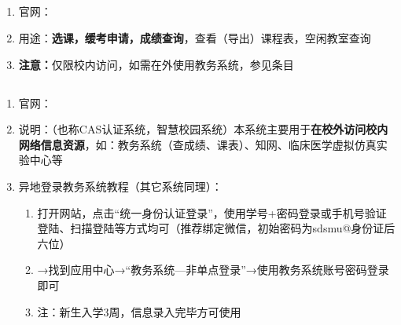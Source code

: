 \subsection[教务系统]{\textbf{}}
\label{academic_affairs_system}
\begin{enumerate}
    \item 官网：
    \item 用途：\textbf{选课，缓考申请，成绩查询}，查看（导出）课程表，空闲教室查询
    \item \textbf{注意：}仅限校内访问，如需在外使用教务系统，参见条目
\end{enumerate}

\subsection[CAS资源访问控制系统（校内VPN）]{\textbf{}\footnotemark}
\label{cas_system}
\begin{enumerate}
    \item 官网：
    \item 说明：（也称CAS认证系统，智慧校园系统）本系统主要用于\textbf{在校外访问校内网络信息资源}，如：教务系统（查成绩、课表）、知网、临床医学虚拟仿真实验中心\footnotemark 等
    \item 异地登录教务系统教程（其它系统同理）：
          \begin{enumerate}
              \item 打开网站，点击“统一身份认证登录”，使用学号+密码登录或手机号验证登陆、扫描登陆等方式均可（推荐绑定微信，初始密码为sdsmu@身份证后六位）
              \item →找到应用中心→“教务系统—非单点登录”\footnotemark →使用教务系统账号密码登录即可
              \item 注：新生入学3周，信息录入完毕方可使用
          \end{enumerate}
\end{enumerate}


